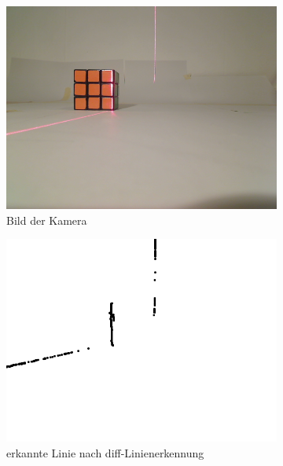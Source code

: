 \documentclass[ngerman,a4paper,parskip=half]{scrartcl}
\begin{document}
\begin{figure}[H]
	\begin{subfigure}{0.32\textwidth}
		\includegraphics[width=\textwidth]{includes/orange_0.png}
		\caption{Bild der Kamera\\}
		\label{fig:orange_0_cam}
	\end{subfigure}
	\hfill
	\begin{subfigure}{0.32\textwidth}
		\includegraphics[width=\textwidth]{includes/orange_0_diff.png}
		\caption{erkannte Linie nach diff-Linienerkennung}
		\label{fig:orange_0_diff}
	\end{subfigure}
	\hfill
	\begin{subfigure}{0.32\textwidth}

\end{subfigure}
\end{figure}
\end{document}

